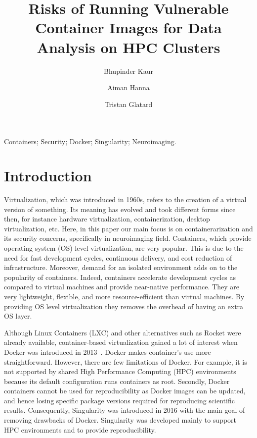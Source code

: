 \documentclass[a4paper,num-refs]{oup-contemporary}
\title{Risks of Running Vulnerable Container Images for Data Analysis on HPC
Clusters}
\begin{document}
\author[1]{Bhupinder Kaur}
\author[1]{Aiman Hanna}
\author[1]{Tristan Glatard}


\maketitle

\begin{keywords}
Containers; Security; Docker; Singularity; Neuroimaging.
\end{keywords}


\section{Introduction}

Virtualization, which was introduced in 1960s, refers to the creation of a virtual
version of something. Its meaning has evolved and took different forms since then, for
instance hardware virtualization, containerization, desktop virtualization, etc.
Here, in this paper our main focus is on containerarization and its security concerns,
specifically in neuroimaging field.
Containers, which provide operating system (OS) level virtualization, are very
popular. This is due to the need for fast development cycles, continuous delivery,
and cost reduction of infrastructure. Moreover, demand for an isolated
environment adds on to the popularity of containers. Indeed, containers accelerate
development cycles as compared to virtual machines and provide near-native performance.
They are very lightweight, flexible, and more resource-efficient than virtual
machines. By providing OS level virtualization they
removes the overhead of having an extra OS layer.

Although Linux Containers (LXC) and other alternatives such as Rocket were already
available, container-based virtualization gained a lot of interest when Docker was
introduced in 2013~\cite{gantikow2016providing}. Docker makes container's use more straightforward. However, there
are few limitations of Docker. For example, it is not supported by shared High Performance
Computing (HPC) environments because its default configuration runs containers
as root. Secondly, Docker containers cannot be used for reproducibility as Docker
images can be updated, and hence losing specific package versions required for
reproducing scientific results. Consequently, Singularity was introduced in 2016 with the main
goal of removing drawbacks of Docker. Singularity was developed mainly to
support HPC environments and to provide reproducibility.
\end{document}
